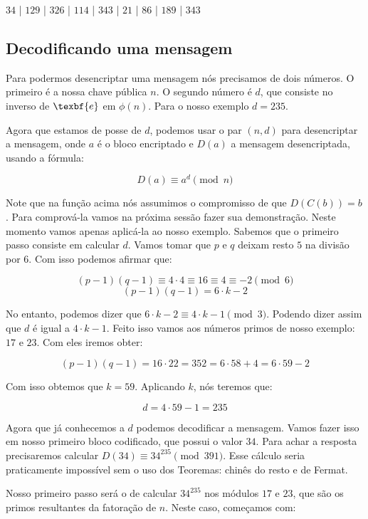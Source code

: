 \begin{center}
	 $34$ | $129$ | $326$ | $114$ | $343$ | $21$ | $86$ | $189$ | $343$
\end{center}

\subsection{Decodificando uma mensagem}

Para podermos desencriptar uma mensagem n\'os precisamos de dois n\'umeros. O primeiro \'e a nossa chave p\'ublica $n$. O segundo n\'umero \'e $d$, que consiste no inverso de $\texbf{e}$ em $\phi(n)$. Para o nosso exemplo $d= 235$.

Agora que estamos de posse de $d$, podemos usar o par $(n,d)$ para desencriptar a mensagem, onde $a$ \'e o bloco encriptado e $D(a)$ a mensagem desencriptada, usando a f\'ormula:

$$D(a) \equiv a^d \pmod{n}$$

Note que na fun\c{c}\~ao acima n\'os assumimos o compromisso de que $D(C(b)) = b$. Para comprov\'a-la vamos na pr\'oxima sess\~ao fazer sua demonstra\c{c}\~ao. Neste momento vamos apenas aplic\'a-la ao nosso exemplo. Sabemos que o primeiro passo consiste em calcular $d$. Vamos tomar que $p$ e $q$ deixam resto $5$ na divis\~ao por $6$. Com isso podemos afirmar que:

$$(p-1)(q-1) \equiv 4 \cdot 4 \equiv 16 \equiv 4 \equiv -2 \pmod{6}$$
$$(p-1)(q-1) = 6 \cdot k -2$$

No entanto, podemos dizer que $6 \cdot k - 2 \equiv 4 \cdot k - 1 \pmod{3}$. Podendo dizer assim que $d$ \'e igual a $4 \cdot k -1$. Feito isso vamos aos n\'umeros primos de nosso exemplo: $17$ e $23$. Com eles iremos obter:

$$(p-1)(q-1) = 16 \cdot 22 = 352 = 6 \cdot 58 + 4 = 6\cdot 59 -2$$

Com isso obtemos que $k=59$. Aplicando $k$, n\'os teremos que:

$$d = 4 \cdot 59 - 1 = 235$$

Agora que j\'a conhecemos a $d$ podemos decodificar a mensagem. Vamos fazer isso em nosso primeiro bloco codificado, que possui o valor $34$. Para achar a resposta precisaremos calcular $D(34) \equiv 34^{235} \pmod{391}$. Esse c\'alculo seria praticamente imposs\'ivel sem o uso dos Teoremas: chin\^es do resto e de Fermat.

Nosso primeiro passo ser\'a o de calcular $34^{235}$ nos m\'odulos $17$ e $23$, que s\~ao os primos resultantes da fatora\c{c}\~ao de $n$. Neste caso, come\c{c}amos com:

